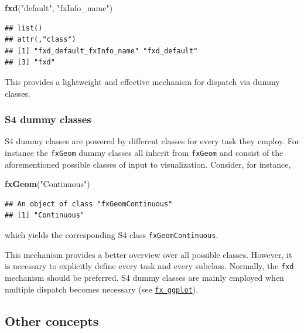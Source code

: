 \documentclass[]{report}
\newenvironment{Shaded}{\begin{snugshade}}{\end{snugshade}}
\newcommand{\KeywordTok}[1]{\textcolor[rgb]{0.13,0.29,0.53}{\textbf{#1}}}
\newcommand{\StringTok}[1]{\textcolor[rgb]{0.31,0.60,0.02}{#1}}
\newcommand{\NormalTok}[1]{#1}
\theoremstyle{definition}
\theoremstyle{definition}
\theoremstyle{definition}
\theoremstyle{remark}
\begin{document}
\begin{Shaded}
\begin{Highlighting}[]
\KeywordTok{fxd}\NormalTok{(}\StringTok{"default"}\NormalTok{, }\StringTok{"fxInfo_name"}\NormalTok{)}
\end{Highlighting}
\end{Shaded}

\begin{verbatim}
## list()
## attr(,"class")
## [1] "fxd_default_fxInfo_name" "fxd_default"            
## [3] "fxd"
\end{verbatim}

This provides a lightweight and effective mechanism for dispatch via
dummy classes.

\subsubsection{S4 dummy classes}\label{s4-dummy-classes}

S4 dummy classes are powered by different classes for every task they
employ. For instance the \texttt{fxGeom} dummy classes all inherit from
\texttt{fxGeom} and consist of the aforementioned possible classes of
input to visualization. Consider, for instance,

\begin{Shaded}
\begin{Highlighting}[]
\KeywordTok{fxGeom}\NormalTok{(}\StringTok{"Continuous"}\NormalTok{)}
\end{Highlighting}
\end{Shaded}

\begin{verbatim}
## An object of class "fxGeomContinuous"
## [1] "Continuous"
\end{verbatim}

which yields the corresponding S4 class \texttt{fxGeomContinuous}.

This mechanism provides a better overview over all possible classes.
However, it is necessary to explicitly define every task and every
subclass. Normally, the \texttt{fxd} mechanism should be preferred. S4
dummy classes are mainly employed when multiple dispatch becomes
necessary (see \protect\hyperlink{fx-ggplot}{\texttt{fx\_ggplot}}).

\subsection{Other concepts}\label{other-concepts}
\end{document}
